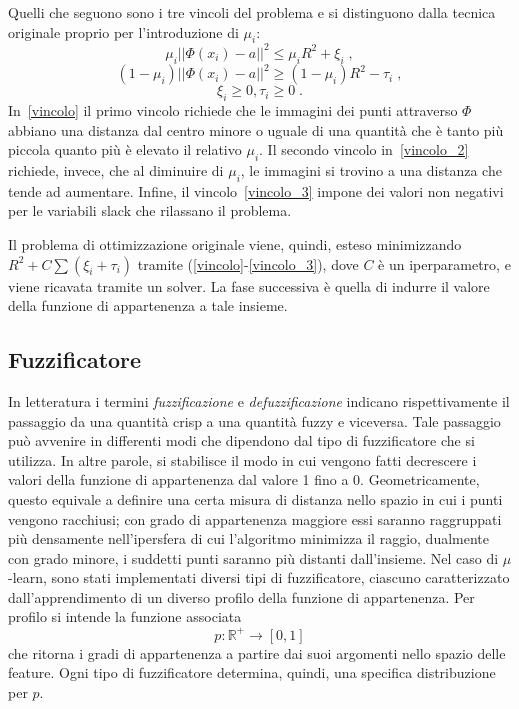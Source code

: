 \documentclass[12pt]{report}
\theoremstyle{definition}
\begin{document}
Quelli che seguono sono i tre vincoli del problema e si distinguono dalla tecnica originale proprio per l'introduzione di $\mu_i$:
\begin{equation}\label{vincolo}
    \mu_i || \mathit{\Phi}(x_i) - a ||^2 \leq \mu_iR^2 + \xi_i \;,
\end{equation}
\begin{equation}\label{vincolo_2}
    (1 - \mu_i) || \mathit{\Phi}(x_i) - a ||^2 \geq (1 - \mu_i)R^2 - \tau_i \;,
\end{equation}
\begin{equation}\label{vincolo_3}
    \xi_i \geq 0, \tau_i \geq 0 \;.
\end{equation}
In~\ref{vincolo} il primo vincolo richiede che le immagini dei punti attraverso $\mathit{\Phi}$ abbiano una distanza dal centro minore o uguale di una quantità che è tanto più piccola quanto più è elevato il relativo $\mu_i$. Il secondo vincolo in~\ref{vincolo_2} richiede, invece, che al diminuire di $\mu_i$, le immagini si trovino a una distanza che tende ad aumentare. Infine, il vincolo~\ref{vincolo_3} impone dei valori non negativi per le variabili slack che rilassano il problema.

Il problema di ottimizzazione originale viene, quindi, esteso minimizzando $R^2 + C\sum(\xi_i + \tau_i)$ tramite (\ref{vincolo}-\ref{vincolo_3}), dove $C$ è un iperparametro, e viene ricavata tramite un solver.
La fase successiva è quella di indurre il valore della funzione di appartenenza a tale insieme.

\subsection{Fuzzificatore} \label{fuzzificatore}
In letteratura i termini \textit{fuzzificazione} e \textit{defuzzificazione} indicano rispettivamente il passaggio da una quantità crisp a una quantità fuzzy e viceversa.
Tale passaggio può avvenire in differenti modi che dipendono dal tipo di fuzzificatore che si utilizza. 
In altre parole, si stabilisce il modo in cui vengono fatti decrescere i valori della funzione di appartenenza dal valore 1 fino a 0. Geometricamente, questo equivale a definire una certa misura di distanza nello spazio in cui i punti vengono racchiusi; con grado di appartenenza maggiore essi saranno raggruppati più densamente nell'ipersfera di cui l'algoritmo minimizza il raggio, dualmente con grado minore, i suddetti punti saranno più distanti dall'insieme.
Nel caso di $\mu$-learn, sono stati implementati diversi tipi di fuzzificatore, ciascuno caratterizzato dall'apprendimento di un diverso profilo della funzione di appartenenza. Per profilo si intende la funzione associata 
\begin{equation}
    p: \mathbb{R}^+ \rightarrow [0,1]
\end{equation}
che ritorna i gradi di appartenenza a partire dai suoi argomenti nello spazio delle feature. Ogni tipo di fuzzificatore determina, quindi, una specifica distribuzione per $p$.
\end{document}
